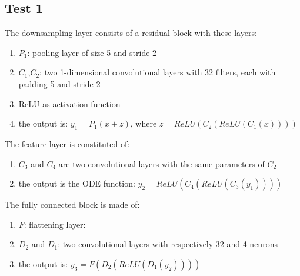 \documentclass[LaM,binding=0.6cm]{sapthesis}
\begin{document}
\subsection{Test 1}
The downsampling layer consists of a residual block with these layers:
\begin{enumerate}
\item $P_1$: pooling layer of size 5 and stride 2
\item $C_1$,$C_2$: two 1-dimensional convolutional layers with 32 filters, each with padding 5 and stride 2
\item ReLU as activation function
\item the output is: $y_1=P_1\left(x+z\right)$, where $z=ReLU\left(C_2\left(ReLU\left(C_1\left(x\right)\right)\right)\right)$
\end{enumerate}
The feature layer is constituted of:
\begin{enumerate}
\item $C_3$ and $C_4$ are two convolutional layers with the same parameters of $C_2$
\item the output is the ODE function: $y_2=ReLU\left(C_4\left(ReLU\left(C_3\left(y_1\right)\right)\right)\right)$
\end{enumerate}
The fully connected block is made of:
\begin{enumerate}
\item $F$: flattening layer: 
\item $D_2$ and $D_1$:  two convolutional layers with respectively 32 and 4 neurons
\item the output is: $y_3=F(D_2(ReLU(D_1(y_2))))$
\end{enumerate}
\end{document}
